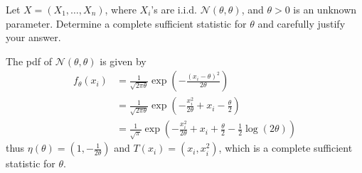 \documentclass{article}
\begin{document}
\pagebreak

\begin{homeworkProblem}

    Let $X = (X_1, \dots, X_n)$, where $X_i$'s are i.i.d. $\mathcal{N}(\theta, \theta)$, and $\theta > 0$ is an unknown parameter. Determine a complete sufficient statistic for $\theta$ and carefully justify your answer. \\

    \solution

    The pdf of $\mathcal{N}(\theta, \theta)$ is given by
    \begin{align*}
        f_\theta(x_i) & = \frac{1}{\sqrt{2 \pi \theta}} \exp \left( -\frac{(x_i - \theta)^2}{2 \theta} \right)                                  \\
                      & = \frac{1}{\sqrt{2 \pi \theta}} \exp \left( -\frac{x_i^2}{2 \theta} + x_i - \frac{\theta}{2} \right)                    \\
                      & = \frac{1}{\sqrt{\pi}} \exp \left( -\frac{x_i^2}{2\theta} + x_{i} + \frac{\theta}{2} -\frac{1}{2} \log(2\theta) \right)
    \end{align*}
    thus $\eta(\theta) = \left( 1, -\frac{1}{2\theta}\right)$ and $T(x_i) = (x_i, x_i^2)$, which is a complete sufficient statistic for $\theta$.

\end{homeworkProblem}

\pagebreak
\end{document}
